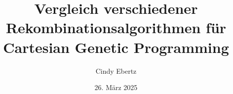 \def\thetitle{Vergleich verschiedener Rekombinationsalgorithmen für Cartesian Genetic Programming}
\def\theauthor{Cindy Ebertz}
\def\thedate{26. März 2025}


\title{\thetitle}
\author{\theauthor}
\date{\thedate}
